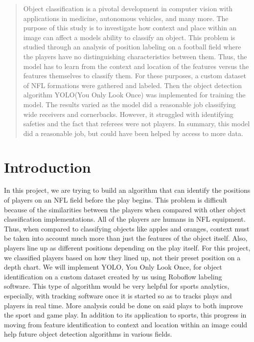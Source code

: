 \author{
    \emph{The Playmakers}: John Michael Slezak, Atif Khan, Chenhao Lu, Ruida Zeng.\\
    \emph{TA name:} Joel Manasseh.
    Brown University\\
}

\maketitle

\begin{abstract}
Object classification is a pivotal development in computer vision with applications in medicine, autonomous vehicles, and many more. The purpose of this study is to investigate how context and place within an image can affect a models ability to classify an object. This problem is studied through an analysis of position labeling on a football field where the players have no distinguishing characteristics between them. Thus, the model has to learn from the context and location of the features versus the features themselves to classify them. For these purposes, a custom dataset of NFL formations were gathered and labeled. Then the object detection algorithm YOLO(You Only Look Once) was implemented for training the model. The results varied as the model did a reasonable job classifying wide receivers and cornerbacks. However, it struggled with identifying safeties and the fact that referees were not players. In summary, this model did a reasonable job, but could have been helped by access to more data. 
\end{abstract}


\section{Introduction}


In this project, we are trying to build an algorithm that can identify the positions of players on an NFL field before the play begins. This problem is difficult because of the similarities between the players when compared with other object classification implementations. All of the players are humans in NFL equipment. Thus, when compared to classifying objects like apples and oranges, context must be taken into account much more than just the features of the object itself. Also, players line up as different positions depending on the play itself. For this project, we classified players based on how they lined up, not their preset position on a depth chart. 
We will implement YOLO, You Only Look Once, for object identification on a custom dataset created by us using Roboflow labeling software. This type of algorithm would be very helpful for sports analytics, especially, with tracking software once it is started so as to tracks plays and players in real time. More analysis could be done on said plays to both improve the sport and game play. In addition to its application to sports, this progress in moving from feature identification to context and location within an image could help future object detection algorithms in various fields.

